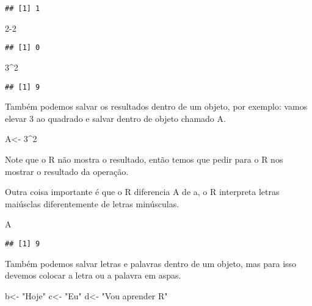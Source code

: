 \documentclass[
]{article}
\newenvironment{Shaded}{\begin{snugshade}}{\end{snugshade}}
\newcommand{\DecValTok}[1]{\textcolor[rgb]{0.00,0.00,0.81}{#1}}
\newcommand{\NormalTok}[1]{#1}
\newcommand{\OtherTok}[1]{\textcolor[rgb]{0.56,0.35,0.01}{#1}}
\newcommand{\SpecialCharTok}[1]{\textcolor[rgb]{0.00,0.00,0.00}{#1}}
\newcommand{\StringTok}[1]{\textcolor[rgb]{0.31,0.60,0.02}{#1}}
\begin{document}
\begin{verbatim}
## [1] 1
\end{verbatim}

\begin{Shaded}
\begin{Highlighting}[]
\DecValTok{2{-}2}
\end{Highlighting}
\end{Shaded}

\begin{verbatim}
## [1] 0
\end{verbatim}

\begin{Shaded}
\begin{Highlighting}[]
\DecValTok{3}\SpecialCharTok{\^{}}\DecValTok{2}
\end{Highlighting}
\end{Shaded}

\begin{verbatim}
## [1] 9
\end{verbatim}

Também podemos salvar os resultados dentro de um objeto, por exemplo:
vamos elevar 3 ao quadrado e salvar dentro de objeto chamado A.

\begin{Shaded}
\begin{Highlighting}[]
\NormalTok{A}\OtherTok{\textless{}{-}} \DecValTok{3}\SpecialCharTok{\^{}}\DecValTok{2}
\end{Highlighting}
\end{Shaded}

Note que o R não mostra o resultado, então temos que pedir para o R nos
mostrar o resultado da operação.

Outra coisa importante é que o R diferencia A de a, o R interpreta
letras maiúsclas diferentemente de letras minúsculas.

\begin{Shaded}
\begin{Highlighting}[]
\NormalTok{A}
\end{Highlighting}
\end{Shaded}

\begin{verbatim}
## [1] 9
\end{verbatim}

Também podemos salvar letras e palavras dentro de um objeto, mas para
isso devemos colocar a letra ou a palavra em aspas.

\begin{Shaded}
\begin{Highlighting}[]
\NormalTok{b}\OtherTok{\textless{}{-}} \StringTok{"Hoje"}
\NormalTok{c}\OtherTok{\textless{}{-}} \StringTok{"Eu"}
\NormalTok{d}\OtherTok{\textless{}{-}} \StringTok{"Vou aprender R"}
\end{Highlighting}
\end{Shaded}
\end{document}
